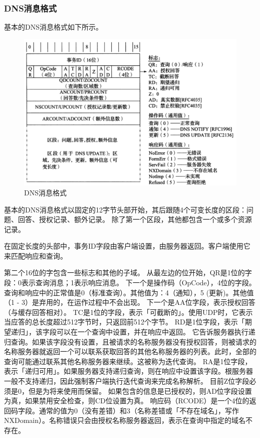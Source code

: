 \documentclass[]{article}
\begin{document}
        \subsubsection{DNS消息格式}
            基本的DNS消息格式如下所示。
            \begin{figure}[ht]
                \centering
                \includegraphics[scale=0.6]{dns.png}
                \caption{DNS消息格式}
            \end{figure}
            基本的DNS消息格式以固定的12字节头部开始，其后跟随4个可变长度的区段：问题、回答、授权记录、额外记录。
            除了第一个区段，其他都包含一个或多个资源记录。

            在固定长度的头部中，事务ID字段由客户端设置，由服务器返回。客户端使用它来匹配响应和查询。
            
            第二个16位的字包含一些标志和其他的子域。
            从最左边的位开始，QR是1位的字段：0表示查询消息；1表示响应消息。
            下一个是操作码（OpCode），4位的字段。查询和响应中的正常值是0（标准查询）。其他值为：4（通知），5 (更新)。其他值（1 - 3）是弃用的，在运作过程中不会出现。
            下一个是AA位字段，表示授权回答（与缓存回答相对）。
            TC是1位的字段，表示「可截断的」。使用UDP时，它表示当应答的总长度超过512字节时，只返回前512个字节。
            RD是1位字段，表示「期望递归」，该字段可以在一个查询中设置，并在响应中返回。
            它告诉服务器执行递归查询。如果该字段没有设置，且被请求的名称服务器没有授权回答，则被请求的名称服务器就返回一个可以联系获取回答的其他名称服务器的列表。此时，全部的查询可能通过联系其他名称服务器来继续。这被称为迭代查询。
            RA是1位字段，表示「递归可用」。如果服务器支持递归查询，则在响应中设置该字段。根服务器一般不支持递归，因此强制客户端执行迭代查询来完成名称解析。
            目前Z位字段必须是0，但是为将来使用而保留。
            如果包含的信息是已授权的，则AD位字段设置为真，如果禁用安全检查，则CD位设置为真。
            响应码（RCODE）是一个4位的返回码字段。通常的值为0（没有差错）和3（名称差错或「不存在域名」，写作NXDomain）。名称错误只会由授权名称服务器返回，表示在查询中指定的域名不存在。
\end{document}
